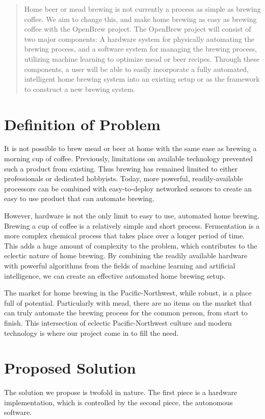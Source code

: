 \begin{abstract}
	Home beer or mead brewing is not currently a process as simple as brewing coffee.
	We aim to change this, and make home brewing as easy as brewing coffee with the OpenBrew project.
	The OpenBrew project will consist of two major components:
	A hardware system for physically automating the brewing process, and a software system for managing the brewing process, utilizing machine learning to optimize mead or beer recipes.
	Through these components, a user will be able to easily incorporate a fully automated, intelligent home brewing system into an existing setup or as the framework to construct a new brewing system.
\end{abstract}

\newpage

\section{Definition of Problem}
It is not possible to brew mead or beer at home with the same ease as brewing a morning cup of coffee.
Previously, limitations on available technology prevented such a product from existing.
Thus brewing has remained limited to either professionals or dedicated hobbyists.
Today, more powerful, readily-available processors can be combined with easy-to-deploy networked sensors to create an easy to use product that can automate brewing.

However, hardware is not the only limit to easy to use, automated home brewing. 
Brewing a cup of coffee is a relatively simple and short process.
Fermentation is a more complex chemical process that takes place over a longer period of time.
This adds a huge amount of complexity to the problem, which contributes to the eclectic nature of home brewing.
By combining the readily available hardware with powerful algorithms from the fields of machine learning and artificial intelligence, we can create an effective automated home brewing setup.

The market for home brewing in the Pacific-Northwest, while robust, is a place full of potential.
Particularly with mead, there are no items on the market that can truly automate the brewing process for the common person, from start to finish.
This intersection of eclectic Pacific-Northwest culture and modern technology is where our project come in to fill the need.

\section{Proposed Solution}
The solution we propose is twofold in nature.
The first piece is a hardware implementation, which is controlled by the second piece, 
the autonomous software.

